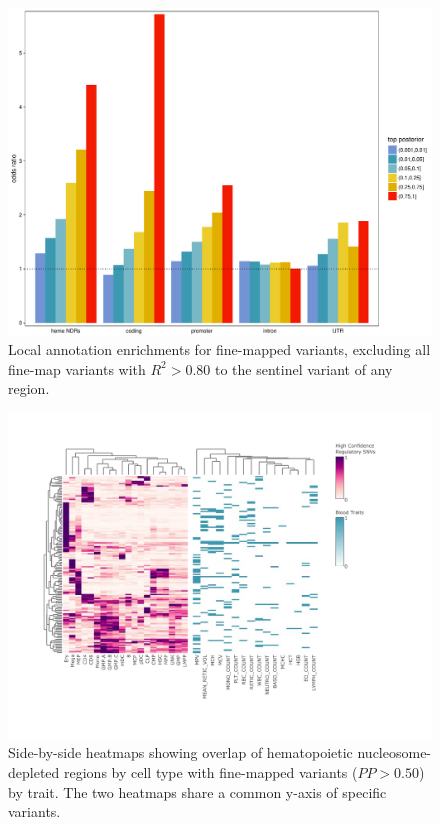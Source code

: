 \documentclass{article}\usepackage[]{graphicx}\usepackage[]{color}
\begin{document}
\begin{figure}
\centering
\includegraphics[width=\linewidth]{staticFigures/FINEMAP_enrichments_ExcludingSentinels.pdf}
\caption{Local annotation enrichments for fine-mapped variants, excluding all fine-map variants with $R^2>0.80$ to the sentinel variant of any region.}
\end{figure} 

\begin{figure}
\centering
\includegraphics[width=\linewidth]{staticFigures/UKBB_PP50_bulk.pdf}
\caption{Side-by-side heatmaps showing overlap of hematopoietic nucleosome-depleted regions by cell type with fine-mapped variants ($PP>0.50$) by trait. The two heatmaps share a common y-axis of specific variants.}
\end{figure} 
\end{document}
